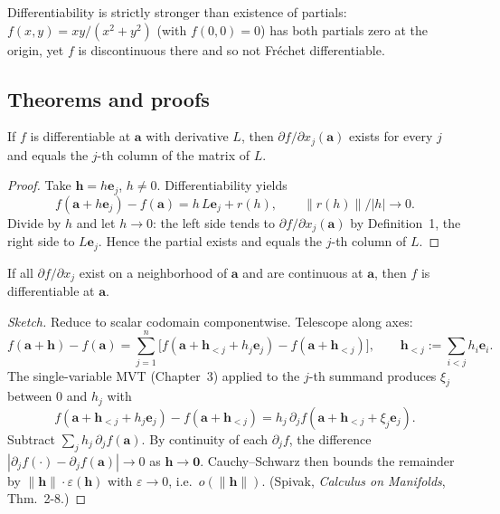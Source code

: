 \begin{remark}
Differentiability is strictly stronger than existence of partials: $f(x,y)=xy/(x^2+y^2)$ (with $f(0,0)=0$) has both partials zero at the origin, yet $f$ is discontinuous there and so not Fr\'echet differentiable.
\end{remark}

\subsection*{Theorems and proofs}

\begin{theorem}[Differentiable implies partials exist; $L=J_f$]
If $f$ is differentiable at $\mathbf{a}$ with derivative $L$, then $\partial f/\partial x_j(\mathbf{a})$ exists for every $j$ and equals the $j$-th column of the matrix of $L$.
\end{theorem}

\begin{proof}
Take $\mathbf{h}=h\mathbf{e}_j$, $h\neq 0$. Differentiability yields
\[
f(\mathbf{a}+h\mathbf{e}_j)-f(\mathbf{a}) = h\,L\mathbf{e}_j + r(h),\qquad \|r(h)\|/|h|\to 0.
\]
Divide by $h$ and let $h\to 0$: the left side tends to $\partial f/\partial x_j(\mathbf{a})$ by Definition~1, the right side to $L\mathbf{e}_j$. Hence the partial exists and equals the $j$-th column of $L$.
\end{proof}

\begin{theorem}
If all $\partial f/\partial x_j$ exist on a neighborhood of $\mathbf{a}$ and are continuous at $\mathbf{a}$, then $f$ is differentiable at $\mathbf{a}$.
\end{theorem}

\begin{proof}[Sketch]
Reduce to scalar codomain componentwise. Telescope along axes:
\[
f(\mathbf{a}+\mathbf{h})-f(\mathbf{a}) = \sum_{j=1}^n\!\Big[f(\mathbf{a}+\mathbf{h}_{<j}+h_j\mathbf{e}_j)-f(\mathbf{a}+\mathbf{h}_{<j})\Big],\qquad \mathbf{h}_{<j}:=\!\!\sum_{i<j} h_i\mathbf{e}_i.
\]
The single-variable MVT (Chapter~3) applied to the $j$-th summand produces $\xi_j$ between $0$ and $h_j$ with
\[
f(\mathbf{a}+\mathbf{h}_{<j}+h_j\mathbf{e}_j)-f(\mathbf{a}+\mathbf{h}_{<j}) = h_j\,\partial_j f(\mathbf{a}+\mathbf{h}_{<j}+\xi_j\mathbf{e}_j).
\]
Subtract $\sum_j h_j\,\partial_j f(\mathbf{a})$. By continuity of each $\partial_j f$, the difference $|\partial_j f(\cdot)-\partial_j f(\mathbf{a})|\to 0$ as $\mathbf{h}\to\mathbf{0}$. Cauchy--Schwarz then bounds the remainder by $\|\mathbf{h}\|\cdot \varepsilon(\mathbf{h})$ with $\varepsilon\to 0$, i.e.\ $o(\|\mathbf{h}\|)$. (Spivak, \emph{Calculus on Manifolds}, Thm.~2-8.)
\end{proof}

